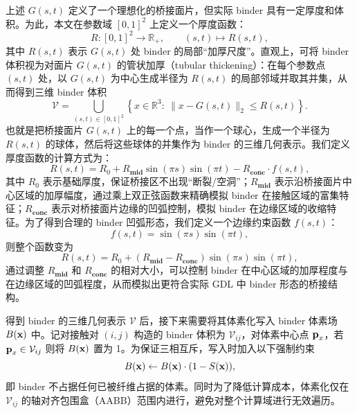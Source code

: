 上述 $G(s,t)$ 定义了一个理想化的桥接面片，但实际 binder 具有一定厚度和体积。为此，本文在参数域 $[0,1]^2$ 上定义一个厚度函数：
\begin{equation}
R:[0,1]^2\rightarrow \mathbb{R}_{+},\qquad (s,t)\mapsto R(s,t),
\end{equation}
其中 $R(s,t)$ 表示 $G(s,t)$ 处 binder 的局部“加厚尺度”。直观上，可将 binder 体积视为对面片 $G(s,t)$ 的管状加厚（tubular thickening）：在每个参数点 $(s,t)$ 处，以 $G(s,t)$ 为中心生成半径为 $R(s,t)$ 的局部邻域并取其并集，从而得到三维 binder 体积
\begin{equation}
\mathcal{V}=\bigcup_{(s,t)\in[0,1]^2}\left\{x\in\mathbb{R}^3:\ \|x-G(s,t)\|_2\le R(s,t)\right\}.
\end{equation}
也就是把桥接面片 $G(s,t)$ 上的每一个点，当作一个球心，生成一个半径为 $R(s,t)$ 的球体，然后将这些球体的并集作为 binder 的三维几何表示。我们定义厚度函数的计算方式为：
\begin{equation}
R(s,t) = R_0 + R_{\textbf{mid}} \sin(\pi s) \sin(\pi t) - R_{\textbf{conc}} \cdot f(s,t),
\end{equation}
其中 $R_0$ 表示基础厚度，保证桥接区不出现“断裂/空洞”；$R_{\textbf{mid}}$ 表示沿桥接面片中心区域的加厚幅度，通过乘上双正弦函数来精确模拟 binder 在接触区域的富集特征；$R_{\textbf{conc}}$ 表示对桥接面片边缘的凹弧控制，模拟 binder 在边缘区域的收缩特征。为了得到合理的 binder 凹弧形态，我们定义一个边缘约束函数 $f(s,t)$：
\begin{equation}
f(s,t) = \sin(\pi s) \sin(\pi t),
\end{equation}
则整个函数变为
\begin{equation}
R(s,t) = R_0 + (R_{\textbf{mid}} - R_{\textbf{conc}}) \sin(\pi s) \sin(\pi t),
\end{equation}
通过调整 $R_{\textbf{mid}}$ 和 $R_{\textbf{conc}}$ 的相对大小，可以控制 binder 在中心区域的加厚程度与在边缘区域的凹弧程度，从而模拟出更符合实际 GDL 中 binder 形态的桥接结构。

得到 binder 的三维几何表示 $\mathcal{V}$ 后，接下来需要将其体素化写入 binder 体素场 $B(\textbf x)$ 中。记对接触对 $(i,j)$ 构造的 binder 体积为 $\mathcal{V}_{ij}$，对体素中心点 $\textbf p_x$，若 $\textbf p_x \in \mathcal{V}_{ij}$ 则将 $B(\textbf x)$ 置为 1。为保证三相互斥，写入时加入以下强制约束
\begin{equation}
B(\textbf x) \leftarrow B(\textbf x) \cdot (1 - S(\textbf x)),
\end{equation}
即 binder 不占据任何已被纤维占据的体素。同时为了降低计算成本，体素化仅在 $\mathcal{V}_{ij}$ 的轴对齐包围盒（AABB）范围内进行，避免对整个计算域进行无效遍历。

